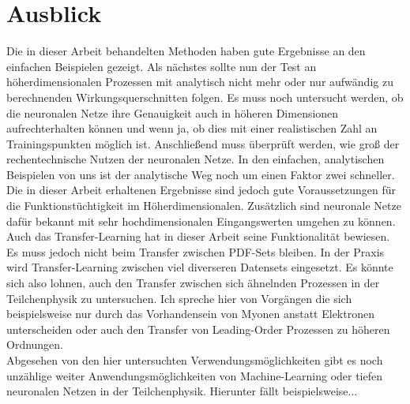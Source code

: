 \section{Ausblick}
Die in dieser Arbeit behandelten Methoden haben gute Ergebnisse an den einfachen Beispielen gezeigt. Als nächstes sollte nun der Test an höherdimensionalen Prozessen mit analytisch nicht mehr oder nur aufwändig zu berechnenden Wirkungsquerschnitten folgen. Es muss noch untersucht werden, ob die neuronalen Netze ihre Genauigkeit auch in höheren Dimensionen aufrechterhalten können und wenn ja, ob dies mit einer realistischen Zahl an Trainingspunkten möglich ist. Anschließend muss überprüft werden, wie groß der rechentechnische Nutzen der neuronalen Netze. In den einfachen, analytischen Beispielen von uns ist der analytische Weg noch um einen Faktor zwei schneller. Die in dieser Arbeit erhaltenen Ergebnisse sind jedoch gute Voraussetzungen für die Funktionstüchtigkeit im Höherdimensionalen. Zusätzlich sind neuronale Netze dafür bekannt mit sehr hochdimensionalen Eingangswerten umgehen zu können. \\
\newline
Auch das Transfer-Learning hat in dieser Arbeit seine Funktionalität bewiesen. Es muss jedoch nicht beim Transfer zwischen PDF-Sets bleiben. In der Praxis wird Transfer-Learning zwischen viel diverseren Datensets eingesetzt. Es könnte sich also lohnen, auch den Transfer zwischen sich ähnelnden Prozessen in der Teilchenphysik zu untersuchen. Ich spreche hier von Vorgängen die sich beispielsweise nur durch das Vorhandensein von Myonen anstatt Elektronen unterscheiden oder auch den Transfer von Leading-Order Prozessen zu höheren Ordnungen. \\
\newline
Abgesehen von den hier untersuchten Verwendungsmöglichkeiten gibt es noch unzählige weiter Anwendungsmöglichkeiten von Machine-Learning oder tiefen neuronalen Netzen in der Teilchenphysik. Hierunter fällt beispielsweise... 

 

\appendix

